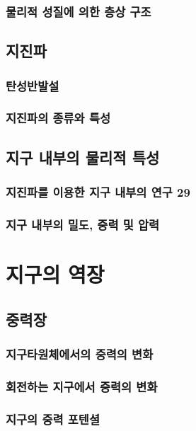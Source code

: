 \subsubsection{물리적 성질에 의한 층상 구조}\index{}
	
\subsection{지진파}\index{}
\subsubsection{탄성반발설}\index{}
\subsubsection{지진파의 종류와 특성}\index{}

\subsection{지구 내부의 물리적 특성}\index{}
\subsubsection{지진파를 이용한 지구 내부의 연구 29 }\index{}
\subsubsection{지구 내부의 밀도, 중력 및 압력}\index{}


\section{지구의 역장}\index{}
\subsection{중력장}\index{}
\subsubsection{지구타원체에서의 중력의 변화}\index{}
\subsubsection{회전하는 지구에서 중력의 변화}\index{}
\subsubsection{지구의 중력 포텐셜}\index{}

